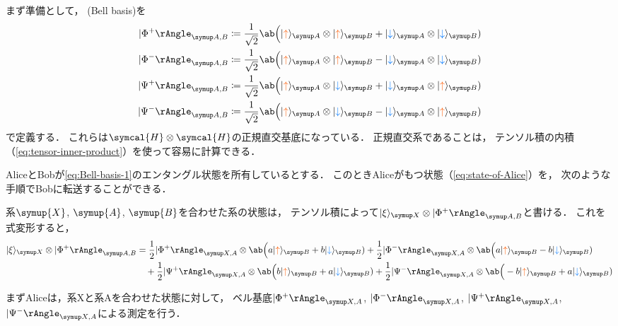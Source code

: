 \documentclass[
]{sotsu}
\newcommand{\bitone}{\mathcolor{fire}{\uparrow}}
\newcommand{\bittwo}{\mathcolor{water}{\downarrow}}
\begin{document}
\quad 
まず準備として，
(Bell basis)を
\begin{subequations}
    \label{eq:Bell-basis}
    \begin{align}
        \label{eq:Bell-basis-1}
        \Ket{\Phi^+}<A,B> 
            &\coloneq \frac{1}{\sqrt{2}}
                \ab\Big( \ket{\bitone}<A> \otimes \ket{\bitone}<B> + \ket{\bittwo}<A> \otimes \ket{\bittwo}<B> )
        \\
        \Ket{\Phi^-}<A,B> 
            &\coloneq \frac{1}{\sqrt{2}}
                \ab\Big( \ket{\bitone}<A> \otimes \ket{\bitone}<B> - \ket{\bittwo}<A> \otimes \ket{\bittwo}<B> )
        \\
        \Ket{\Psi^+}<A,B> 
            &\coloneq \frac{1}{\sqrt{2}}
                \ab\Big( \ket{\bitone}<A> \otimes \ket{\bittwo}<B> + \ket{\bittwo}<A> \otimes \ket{\bitone}<B> )
        \\
        \Ket{\Psi^-}<A,B> 
            &\coloneq \frac{1}{\sqrt{2}}
                \ab\Big( \ket{\bitone}<A> \otimes \ket{\bittwo}<B> - \ket{\bittwo}<A> \otimes \ket{\bitone}<B> )
    \end{align}
\end{subequations}
で定義する．
これらは$\symcal{H} \otimes \symcal{H}$の正規直交基底になっている．
正規直交系であることは，
テンソル積の内積（\cref{eq:tensor-inner-product}）を使って容易に計算できる．


\quad 
AliceとBobが\cref{eq:Bell-basis-1}のエンタングル状態を所有しているとする．
このときAliceがもつ状態（\cref{eq:state-of-Alice}）を，
次のような手順でBobに転送することができる．

系$\symup{X}$, $\symup{A}$, $\symup{B}$を合わせた系の状態は，
テンソル積によって$\ket{\xi}<X> \otimes \Ket{\Phi^+}<A,B>$と書ける．
これを式変形すると，
\begin{equation*}
    \begin{split}
        \ket{\xi}<X> \otimes \Ket{\Phi^+}<A,B>
        &= \frac{1}{2} \Ket{\Phi^+}<X,A> \otimes 
            \ab\Big( a \ket{\bitone}<B> + b \ket{\bittwo}<B> )
        + \frac{1}{2} \Ket{\Phi^-}<X,A> \otimes 
            \ab\Big( a \ket{\bitone}<B> - b \ket{\bittwo}<B> )
            \\
        &\quad + \frac{1}{2} \Ket{\Psi^+}<X,A> \otimes 
            \ab\Big( b \ket{\bitone}<B> + a \ket{\bittwo}<B> )
        + \frac{1}{2} \Ket{\Psi^-}<X,A> \otimes 
            \ab\Big(-b \ket{\bitone}<B> + a \ket{\bittwo}<B> )
\end{split}
\end{equation*}

まずAliceは，系Xと系Aを合わせた状態に対して，
ベル基底$\Ket{\Phi^+}<X,A>$, $\Ket{\Phi^-}<X,A>$, $\Ket{\Psi^+}<X,A>$, $\Ket{\Psi^-}<X,A>$による測定を行う．
\end{document}
